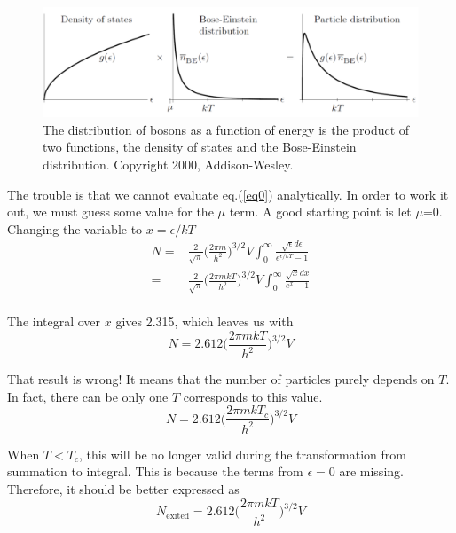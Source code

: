 \begin{figure}[h]
\centering
\includegraphics[width=0.9\linewidth]{imgs/BEC1.png}
\caption{The distribution of bosons as a function of energy is the product of
two functions, the density of states and the Bose-Einstein distribution. Copyright 2000, Addison-Wesley. }
\end{figure}

The trouble is that we cannot evaluate eq.(\ref{eq0}) analytically. In order to work it out, we must guess some value for the $\mu$ term. A good starting point is let $\mu$=0. Changing the variable to $x = \epsilon/kT$
\begin{equation}
\begin{split}
    N = & \frac{2}{\sqrt{\pi}}\bigg(\frac{2\pi m}{h^2}\bigg)^{3/2}V \int_0^{\infty} \frac{\sqrt{\epsilon} d\epsilon}{e^{\epsilon/kT}-1}\\
      = & \frac{2}{\sqrt{\pi}}\bigg(\frac{2\pi mkT}{h^2}\bigg)^{3/2}V \int_{0}^{\infty} \frac{\sqrt{x} dx}{e^x-1}\\
\end{split}
\end{equation}

The integral over $x$ gives 2.315, which leaves us with
\begin{equation}
N = 2.612\bigg(\frac{2\pi mkT}{h^2}\bigg)^{3/2}V
\end{equation}

That result is wrong! It means that the number of particles purely depends on $T$. In fact, there can be only one $T$ corresponds to this value.
\begin{equation}
    N = 2.612\bigg(\frac{2\pi m kT_c}{h^2}\bigg)^{3/2}V
\end{equation}

When $T<T_c$, this will be no longer valid during the transformation from summation to integral. This is because the terms from $\epsilon =0$ are missing. Therefore, it should be better expressed as
\begin{equation}
    N_\textrm{exited} = 2.612\bigg(\frac{2\pi mkT}{h^2}\bigg)^{3/2}V
\end{equation}

